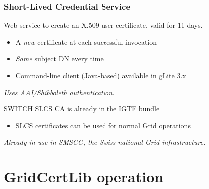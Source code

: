 \documentclass{beamer}
\newcommand{\+}{\vspace{1em}}
\begin{document}
\begin{frame}[label=slcs]
  \frametitle{Short-Lived Credential Service}
  Web service to create an X.509 user certificate,
  valid for 11 days.
  \begin{itemize}
  \item A \emph{new} certificate at each successful invocation
  \item \emph{Same} subject DN every time
  \item Command-line client (Java-based) available in gLite 3.x
  \end{itemize}

  \+ {\em Uses AAI/Shibboleth authentication.}

  \+ SWITCH SLCS CA is already in the IGTF bundle
  \begin{itemize}
  \item SLCS certificates can be used for normal Grid operations
  \end{itemize}

  \+
  {\em Already in use in SMSCG, the Swiss national Grid infrastructure.}

  \+
  \hyperlink{more-slcs}{}
\end{frame}


\section[Project overview]{GridCertLib operation}

\end{document}
